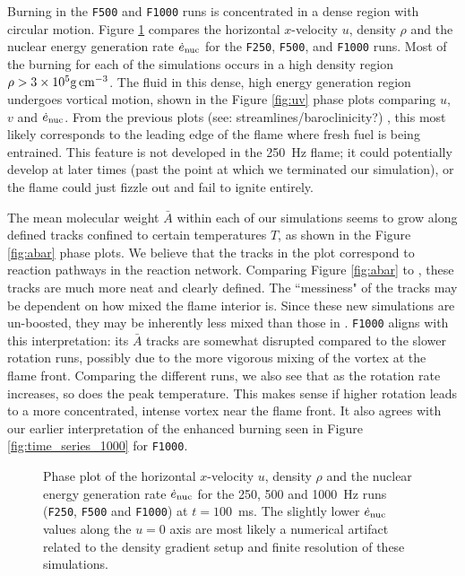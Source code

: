 \documentclass[preprint,times,tighten]{aastex63}
\newcommand{\MarginPar}[1]{
    \marginpar{\vskip-\baselineskip%
               \raggedright%
               \tiny\sffamily%
               {\color{red}\hrule%
               \smallskip%
               #1\par%
               \smallskip%
               \hrule}}%
}
\begin{document}
Burning in the {\tt F500} and {\tt F1000} runs is concentrated in a dense region with circular 
motion. Figure \ref{fig:urho} compares the horizontal $x$-velocity $u$, density $\rho$ and the 
nuclear energy generation rate $\dot{e}_{\rm nuc}$ for the {\tt F250}, {\tt F500}, and {\tt F1000} 
runs. Most of the burning for each of the simulations occurs in a high density region $\rho > 3 
\times 10^5 {\rm g\,cm^{-3}}$. The fluid in this dense, high energy generation region undergoes 
vortical motion, shown in the Figure \ref{fig:uv} phase plots comparing $u$, $v$ and $\dot{e}_{\rm 
nuc}$. From the previous plots (see: streamlines/baroclinicity?) \MarginPar{NF: need to add 
streamline plots?}, this most likely corresponds to the leading edge of the flame where fresh fuel 
is being entrained. This feature is not developed in the 250~Hz flame; it could potentially develop 
at later times (past the point at which we terminated our simulation), or the flame could just 
fizzle out and fail to ignite entirely. 

The mean molecular weight $\bar{A}$ within each of our simulations seems to grow along defined tracks confined to certain temperatures $T$, as shown in the Figure \ref{fig:abar} phase plots. We believe that the tracks in the plot correspond to reaction pathways in the reaction network. Comparing Figure \ref{fig:abar} to \citet{flame_wave1}, these tracks are much more neat and clearly defined. The ``messiness" of the tracks may be dependent on how mixed the flame interior is. Since these new simulations are un-boosted, they may be inherently less mixed than those in \citet{flame_wave1}. {\tt F1000} aligns with this interpretation: its $\bar{A}$ tracks are somewhat disrupted compared to the slower rotation runs, possibly due to the more vigorous mixing of the vortex at the flame front. Comparing the different runs, we also see that as the rotation rate increases, so does the peak temperature. This makes sense if higher rotation leads to a more concentrated, intense vortex near the flame front. It also agrees with our earlier interpretation of the enhanced burning seen in Figure \ref{fig:time_series_1000} for {\tt F1000}. 

\begin{figure}[t]
    \centering
    \caption{\label{fig:urho}Phase plot of the horizontal $x$-velocity $u$, density $\rho$ and the nuclear energy generation rate $\dot{e}_{\rm nuc}$ for the 250, 500 and 1000~Hz runs ({\tt F250}, {\tt F500} and {\tt F1000}) at $t = 100$~ms. The slightly lower $\dot{e}_{\rm nuc}$ values along the $u = 0$ axis are most likely a numerical artifact related to the density gradient setup and finite resolution of these simulations.}
\end{figure}
\end{document}
